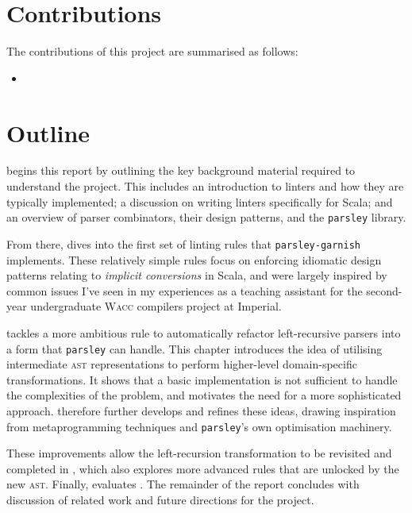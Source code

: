 \documentclass[../../main.tex]{subfiles}
\begin{document}

\section*{Contributions}
The contributions of this project are summarised as follows:
\begin{itemize}
  \item {} %
\end{itemize}

\section*{Outline}
 begins this report by outlining the key background material required to understand the project.
This includes an introduction to linters and how they are typically implemented; a discussion on writing linters specifically for Scala; and an overview of parser combinators, their design patterns, and the \texttt{parsley} library.

From there,  dives into the first set of linting rules that \texttt{parsley-garnish} implements.
These relatively simple rules focus on enforcing idiomatic design patterns relating to \emph{implicit conversions} in Scala, and were largely inspired by common issues I've seen in my experiences as a teaching assistant for the second-year undergraduate \textsc{Wacc} compilers project at Imperial.

 tackles a more ambitious rule to automatically refactor left-recursive parsers into a form that \texttt{parsley} can handle.
This chapter introduces the idea of utilising intermediate \textsc{ast} representations to perform higher-level domain-specific transformations.
It shows that a basic implementation is not sufficient to handle the complexities of the problem, and motivates the need for a more sophisticated approach.
 therefore further develops and refines these ideas, drawing inspiration from metaprogramming techniques and \texttt{parsley}'s own optimisation machinery.

These improvements allow the left-recursion transformation to be revisited and completed in , which also explores more advanced rules that are unlocked by the new \textsc{ast}.
Finally,  evaluates . %
The remainder of the report concludes with discussion of related work and future directions for the project.
\end{document}
